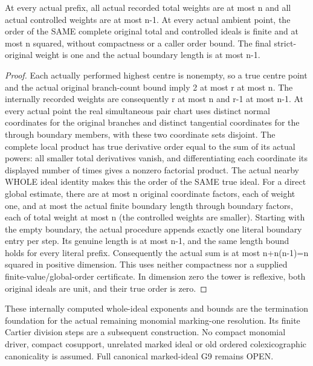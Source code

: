 \begin{theorem}
\label{hir:general-nc-generated-global-original-order-bound}
\leanok
At every actual prefix, all actual recorded total weights are at most n and
all actual controlled weights are at most n-1. At every actual ambient point,
the order of the SAME complete original total and controlled ideals is finite
and at most n squared, without compactness or a caller order bound. The final
strict-original weight is one and the actual boundary length is at most n-1.
\end{theorem}
\begin{proof}
Each actually performed highest centre is nonempty, so a true centre point
and the actual original branch-count bound imply 2 at most r at most n. The
internally recorded weights are consequently r at most n and r-1 at most n-1.
At every actual point the real simultaneous pair chart uses distinct normal
coordinates for the original branches and distinct tangential coordinates
for the through boundary members, with these two coordinate sets disjoint.
The complete local product has true derivative order equal to the sum of its
actual powers: all smaller total derivatives vanish, and differentiating each
coordinate its displayed number of times gives a nonzero factorial product.
The actual nearby WHOLE ideal identity makes this the order of the SAME true
ideal. For a direct global estimate, there are at most n original coordinate
factors, each of weight one, and at most the actual finite boundary length
through boundary factors, each of total weight at most n (the controlled
weights are smaller). Starting with the empty boundary, the actual procedure
appends exactly one literal boundary entry per step. Its genuine length is at
most n-1, and the same length bound holds for every literal prefix. Consequently
the actual sum is at most n+n(n-1)=n squared in positive dimension. This uses
neither compactness nor a supplied finite-value/global-order certificate. In dimension zero the tower
is reflexive, both original ideals are unit, and their true order is zero.
\end{proof}

\begin{remark}
These internally computed whole-ideal exponents and bounds are the termination
foundation for the actual remaining monomial marking-one resolution. Its
finite Cartier division steps are a subsequent construction. No compact
monomial driver, compact cosupport, unrelated marked ideal or old ordered
colexicographic canonicality is assumed. Full canonical marked-ideal G9
remains OPEN.
\end{remark}
